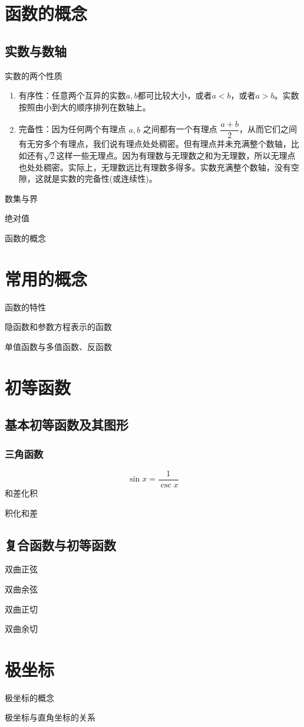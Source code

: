 \usepackage{amsmath}
\usepackage{amssymb}

\section{函数的概念}
\subsection{实数与数轴}
实数的两个性质
\begin{enumerate}
    \item 有序性：任意两个互异的实数$a,b$都可比较大小，或者$a<b$，或者$a>b$。实数按照由小到大的顺序排列在数轴上。
    \item 完备性：因为任何两个有理点 $a,b$ 之间都有一个有理点 $\dfrac{a+b}{2}$，从而它们之间有无穷多个有理点，我们说有理点处处稠密。但有理点并未充满整个数轴，比如还有$\sqrt{2}$这样一些无理点。因为有理数与无理数之和为无理数，所以无理点也处处稠密。实际上，无理数远比有理数多得多。实数充满整个数轴，没有空隙，这就是实数的完备性(或连续性)。
\end{enumerate}

\noindent 数集与界

\noindent 绝对值

\noindent 函数的概念

\section{常用的概念}
\noindent 函数的特性

\noindent 隐函数和参数方程表示的函数

\noindent 单值函数与多值函数、反函数

\section{初等函数}
\subsection{基本初等函数及其图形}
\subsubsection{三角函数}
\[
\sin x=\frac{1}{\csc x}
\]
和差化积

积化和差

\subsection{复合函数与初等函数}
双曲正弦

双曲余弦

双曲正切

双曲余切

\section{极坐标}
\noindent 极坐标的概念

\noindent 极坐标与直角坐标的关系